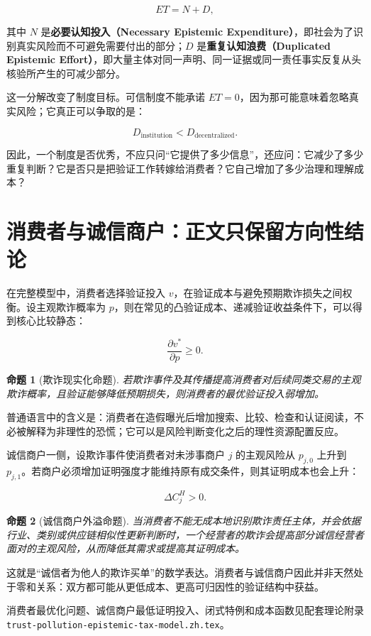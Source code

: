 \documentclass[UTF8,12pt]{ctexart}
\newtheorem{proposition}{命题}
\begin{document}
\[
\boxed{ET=N+D},
\]

其中 $N$ 是\textbf{必要认知投入（Necessary Epistemic Expenditure）}，即社会为了识别真实风险而不可避免需要付出的部分；$D$ 是\textbf{重复认知浪费（Duplicated Epistemic Effort）}，即大量主体对同一声明、同一证据或同一责任事实反复从头核验所产生的可减少部分。

这一分解改变了制度目标。可信制度不能承诺 $ET=0$，因为那可能意味着忽略真实风险；它真正可以争取的是：

\[
D_{\mathrm{institution}}<D_{\mathrm{decentralized}}.
\]

因此，一个制度是否优秀，不应只问“它提供了多少信息”，还应问：它减少了多少重复判断？它是否只是把验证工作转嫁给消费者？它自己增加了多少治理和理解成本？

\section{消费者与诚信商户：正文只保留方向性结论}

在完整模型中，消费者选择验证投入 $v$，在验证成本与避免预期欺诈损失之间权衡。设主观欺诈概率为 $p$，则在常见的凸验证成本、递减验证收益条件下，可以得到核心比较静态：

\[
\boxed{\frac{\partial v^*}{\partial p}\geq0}.
\]

\begin{proposition}[欺诈现实化命题]
若欺诈事件及其传播提高消费者对后续同类交易的主观欺诈概率，且验证能够降低预期损失，则消费者的最优验证投入弱增加。
\end{proposition}

普通语言中的含义是：消费者在造假曝光后增加搜索、比较、检查和认证阅读，不必被解释为非理性的恐慌；它可以是风险判断变化之后的理性资源配置反应。

诚信商户一侧，设欺诈事件使消费者对未涉事商户 $j$ 的主观风险从 $p_{j,0}$ 上升到 $p_{j,1}$。若商户必须增加证明强度才能维持原有成交条件，则其证明成本也会上升：

\[
\boxed{\Delta C_j^{H}>0}.
\]

\begin{proposition}[诚信商户外溢命题]
当消费者不能无成本地识别欺诈责任主体，并会依据行业、类别或供应链相似性更新判断时，一个经营者的欺诈会提高部分诚信经营者面对的主观风险，从而降低其需求或提高其证明成本。
\end{proposition}

这就是“诚信者为他人的欺诈买单”的数学表达。消费者与诚信商户因此并非天然处于零和关系：双方都可能从更低成本、更高可归因性的验证结构中获益。

消费者最优化问题、诚信商户最低证明投入、闭式特例和成本函数见配套理论附录 \texttt{trust-pollution-epistemic-tax-model.zh.tex}。
\end{document}
